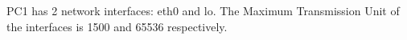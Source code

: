 PC1 has 2 network interfaces: eth0 and lo. \newline
The Maximum Transmission Unit of the interfaces is 1500 and 65536 respectively.